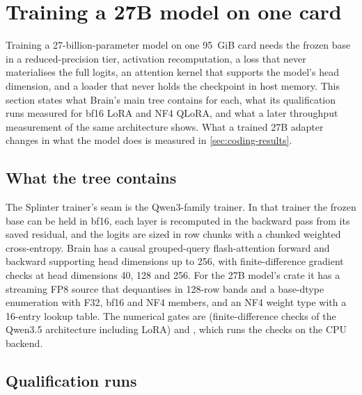 
\section{Training a 27B model on one card}\label{sec:substrate}

Training a 27-billion-parameter model on one 95~GiB card needs the frozen base in a
reduced-precision tier, activation recomputation, a loss that never materialises the
full logits, an attention kernel that supports the model's head dimension, and a loader
that never holds the checkpoint in host memory. This section states what Brain's main
tree contains for each, what its qualification runs measured for bf16 LoRA and NF4
QLoRA, and what a later throughput measurement of the same architecture shows. What a
trained 27B adapter changes in what the model does is measured in
\cref{sec:coding-results}.

\subsection{What the tree contains}

The Splinter trainer's seam is the Qwen3-family trainer. In that trainer the
frozen base can be held in bf16, each layer is recomputed in the backward pass
from its saved residual, and the logits are sized in row chunks with a chunked
weighted cross-entropy. Brain has a causal grouped-query flash-attention forward
and backward supporting head dimensions up to 256, with finite-difference gradient
checks at head dimensions 40, 128 and 256. For the 27B model's crate it has
a streaming FP8 source that dequantises in 128-row bands and a base-dtype enumeration
with F32, bf16 and NF4 members, and an NF4 weight type with a 16-entry lookup
table. The numerical gates are  (finite-difference
checks of the Qwen3.5 architecture including LoRA) and , which
runs the checks on the CPU backend.

\subsection{Qualification runs}\label{sec:qual}

